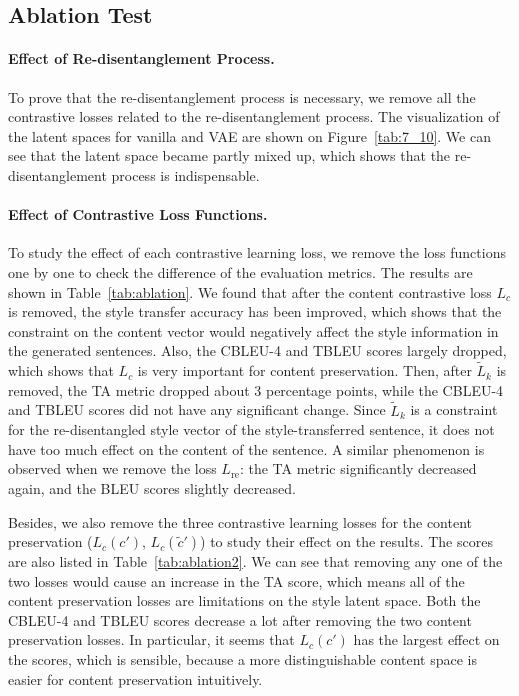 \documentclass[11pt,a4paper]{article}
\begin{document}
\subsection{Ablation Test}
\paragraph{Effect of Re-disentanglement Process.}
To prove that the re-disentanglement process is necessary, we remove all the contrastive losses related to the re-disentanglement process. The visualization of the latent spaces for vanilla and VAE are shown on Figure~\ref{tab:7_10}. We can see that the latent space  became partly mixed up, which shows that the re-disentanglement process is indispensable. 

\paragraph{Effect of Contrastive Loss Functions.}
To study the effect of each contrastive learning loss, we remove the loss functions one by one to check the difference of the evaluation metrics. The results are shown in Table~\ref{tab:ablation}. We found that after the content contrastive loss $L_c$ is removed, the style transfer accuracy has been improved, which shows that the constraint on the content vector would negatively affect the style information in the generated sentences. Also, the CBLEU-4 and TBLEU scores largely dropped, which shows that $L_c$ is very important for content preservation. Then, after $\tilde L_k$ is removed,  the TA metric dropped about $3$ percentage points, while the CBLEU-4 and TBLEU scores did not have any significant change. Since $\tilde L_k$ is a constraint for the re-disentangled style vector of the style-transferred sentence, it does not have too much  effect on the content of the sentence. A similar phenomenon is observed when we remove the loss $L_\text{re}$: the TA metric significantly decreased again, and the  BLEU scores slightly decreased.

Besides, we also remove the three contrastive learning losses for the content preservation ($L_c(c')$, $L_c(\tilde c')$) to study their effect on the results. The scores are also listed in Table~\ref{tab:ablation2}. We can see that removing any one of the two losses would cause an increase in the TA score, which means all of the content preservation losses are limitations on the style latent space. Both the CBLEU-4 and TBLEU scores decrease a lot after removing the two content preservation losses. In particular,  it seems that $L_c(c')$ has the largest effect on the scores, which is sensible, because a more distinguishable content space is easier for content preservation  intuitively. 
\end{document}
